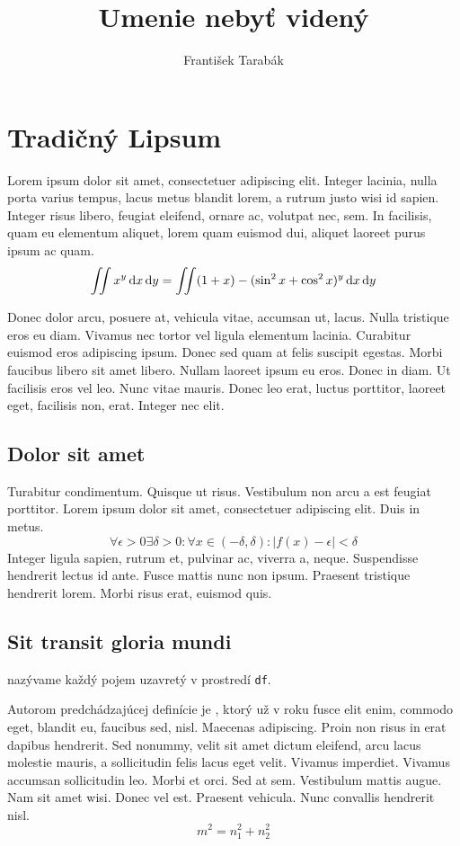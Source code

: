 \documentclass[english, thesismargins, thesislinespacing, twoside, draft]{rnthesis}
\title{Umenie nebyť videný}
\author{František Tarabák}
\begin{document}
\maketitle
\newpage
\tableofcontents
\newpage
\chapter{Tradičný Lipsum}

Lorem ipsum dolor sit amet, consectetuer adipiscing elit.
Integer lacinia, nulla porta varius tempus, lacus metus blandit
lorem, a rutrum justo wisi id sapien. Integer risus libero,
feugiat eleifend, ornare ac, volutpat nec, sem. In facilisis,
quam eu elementum aliquet, lorem quam euismod dui, aliquet
laoreet purus ipsum ac quam. 
%
$$\int\!\!\!\int x^y\,{\rm d}x\,{\rm d}y = \int\!\!\!\int (1 + x) - (\sin^2 x + \cos^2 x)^y\,{\rm d}x\,{\rm d}y$$

Donec dolor arcu, posuere at, vehicula vitae, accumsan ut,
lacus. Nulla tristique eros eu diam. Vivamus nec tortor vel
ligula elementum lacinia. Curabitur euismod eros adipiscing
ipsum. Donec sed quam at felis suscipit egestas. Morbi faucibus
libero sit amet libero. Nullam laoreet ipsum eu eros. Donec in
diam. Ut facilisis eros vel leo. Nunc vitae mauris. Donec leo
erat, luctus porttitor, laoreet eget, facilisis non, erat.
Integer nec elit.

\section{Dolor sit amet}

Turabitur condimentum. Quisque ut risus. Vestibulum non arcu a
est feugiat porttitor. Lorem ipsum dolor sit amet, consectetuer
adipiscing elit. Duis in metus. 
%
$$\forall \epsilon>0 \exists \delta>0:\forall x\in(-\delta,\delta):|f(x)-\epsilon|<\delta$$
%
Integer ligula sapien, rutrum et, pulvinar ac, viverra a,
neque. Suspendisse hendrerit lectus id ante. Fusce mattis nunc
non ipsum. Praesent tristique hendrerit lorem. Morbi risus
erat, euismod quis.

\section{Sit transit gloria mundi}
\begin{df}
 nazývame každý pojem uzavretý v prostredí 
\texttt{df}.
\end{df}

Autorom predchádzajúcej definície je ,
ktorý už v roku fusce elit enim, commodo eget, blandit eu,
faucibus sed, nisl. Maecenas adipiscing. Proin non risus in
erat dapibus hendrerit. Sed nonummy, velit sit amet dictum
eleifend, arcu lacus molestie mauris, a sollicitudin felis
lacus eget velit. Vivamus imperdiet. Vivamus accumsan
sollicitudin leo. Morbi et orci. Sed at sem. Vestibulum mattis
augue. Nam sit amet wisi. Donec vel est. Praesent vehicula.
Nunc convallis hendrerit nisl.
%
$$m^2=n_1^2+n_2^2$$
\end{document}
